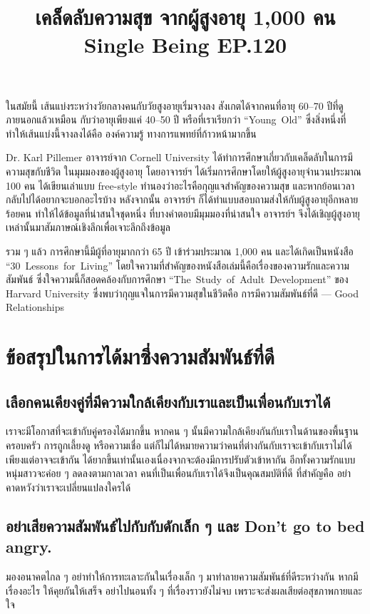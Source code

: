 \documentclass[a4paper]{article}
\title{\flushleft\Huge\textbf{เคล็ดลับความสุข จากผู้สูงอายุ 1,000 คน}\\
\Large Single Being EP.120\\
\vspace{-4ex}}
\date{}
\begin{document}
\maketitle
\sloppy
\flushleft

ในสมัยนี้ เส้นแบ่งระหว่างวัยกลางคนกับวัยสูงอายุเริ่มจางลง สังเกตได้จากคนที่อายุ 60--70 ปีที่ดูภายนอกแล้วเหมือน
กับว่าอายุเพียงแค่ 40--50 ปี หรือที่เราเรียกว่า \mbox{``Young Old''} ซึ่งสิ่งหนึ่งที่ทำให้เส้นแบ่งนี้จางลงได้คือ องค์ความรู้
ทางการแพทย์ที่ก้าวหน้ามากขึ้น

\rule{0em}{1ex}

Dr. Karl Pillemer อาจารย์จาก Cornell University ได้ทำการศึกษาเกี่ยวกับเคล็ดลับในการมีความสุขกับชีวิต
ในมุมมองของผู้สูงอายุ โดยอาจารย์ฯ ได้เริ่มการศึกษาโดยให้ผู้สูงอายุจำนวนประมาณ 100 คน ได้เขียนเล่าแบบ
free-style ทำนองว่าอะไรคือกุญแจสำคัญของความสุข และหากย้อนเวลากลับไปได้อยากจะบอกอะไรบ้าง
หลังจากนั้น อาจารย์ฯ ก็ได้ทำแบบสอบถามส่งให้กับผู้สูงอายุอีกหลายร้อยคน ทำให้ได้ข้อมูลที่น่าสนใจชุดหนึ่ง
ที่บางคำตอบมีมุมมองที่น่าสนใจ อาจารย์ฯ จึงได้เชิญผู้สูงอายุเหล่านั้นมาสัมภาษณ์เชิงลึกเพื่อเจาะลึกถึงข้อมูล

\rule{0em}{1ex}

รวม ๆ แล้ว การศึกษานี้มีผู้ที่อายุมากกว่า 65 ปี เข้าร่วมประมาณ 1,000 คน และได้เกิดเป็นหนังสือ
\mbox{``30 Lessons for Living''} โดยใจความที่สำคัญของหนังสือเล่มนี้คือเรื่องของความรักและความสัมพันธ์
ซึ่งใจความนี้ก็สอดคล้องกับการศึกษา \mbox{``The Study of Adult Development''} ของ Harvard University
ซึ่งพบว่ากุญแจในการมีความสุขในชีวิตคือ การมีความสัมพันธ์ที่ดี --- Good Relationships

\rule{0em}{1ex}

\section*{ข้อสรุปในการได้มาซึ่งความสัมพันธ์ที่ดี}


\subsection*{เลือกคนเคียงคู่ที่มีความใกล้เคียงกับเราและเป็นเพื่อนกับเราได้}
เราจะมีโอกาสที่จะเข้ากับคู่ครองได้มากขึ้น หากคน ๆ นั้นมีความใกล้เคียงกันกับเราในด้านของพื้นฐานครอบครัว
การถูกเลี้ยงดู หรือความเชื่อ แต่ก็ไม่ได้หมายความว่าคนที่ต่างกันกับเราจะเข้ากับเราไม่ได้ เพียงแต่อาจจะเข้ากัน
ได้ยากขึ้นเท่านั้นเองเนื่องจากจะต้องมีการปรับตัวเข้าหากัน อีกทั้งความรักแบบหนุ่มสาวจะค่อย ๆ ลดลงตามกาลเวลา 
คนที่เป็นเพื่อนกับเราได้จึงเป็นคุณสมบัติที่ดี ที่สำคัญคือ อย่าคาดหวังว่าเราจะเปลี่ยนแปลงใครได้

\subsection*{อย่าเสียความสัมพันธ์ไปกับกับดักเล็ก ๆ และ Don't go to bed angry.}
มองอนาคตไกล ๆ อย่าทำให้การทะเลาะกันในเรื่องเล็ก ๆ มาทำลายความสัมพันธ์ที่ดีระหว่างกัน
หากมีเรื่องอะไร ให้คุยกันให้เสร็จ อย่าไปนอนทั้ง ๆ ที่เรื่องราวยังไม่จบ เพราะจะส่งผลเสียต่อสุขภาพกายและใจ
\end{document}
